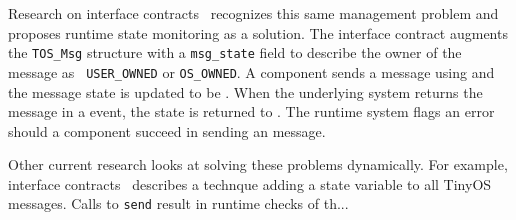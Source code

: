 % 
% 
% 



Research on interface contracts~\cite{archer07interface} recognizes this
same management problem and proposes runtime state monitoring as a solution.
%
The  interface contract augments the {\tt TOS\_Msg} structure
with a {\tt msg\_state} field to describe the owner of the message as {\tt
USER\_OWNED} or {\tt OS\_OWNED}.
%
A component sends a  message using  and the
message state is updated to be .
%
When the underlying system returns the message in a  event,
the state is returned to .
%
The runtime system flags an error should a component succeed in sending an
 message. 



Other current research looks at solving these problems dynamically.
%
For example, interface contracts~\cite{archer07interface} describes a
technque adding a state variable to all TinyOS messages.
%
Calls to {\tt send} result in runtime checks of th...


